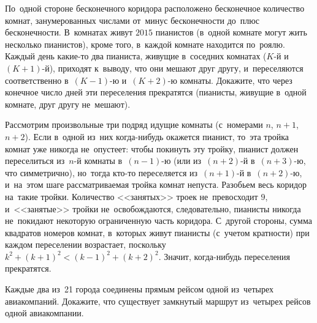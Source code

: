 \begin{problems}

\item
По~одной стороне бесконечного коридора расположено бесконечное количество
комнат, занумерованных числами от~минус бесконечности до~плюс бесконечности.
В~комнатах живут $2015$ пианистов (в~одной комнате могут жить несколько
пианистов), кроме того, в~каждой комнате находится по~роялю.
Каждый день какие-то два пианиста, живущие в~соседних комнатах
($K$-й и~$(K + 1)$-й), приходят к~выводу, что они мешают друг другу,
и~переселяются соответственно в~$(K - 1)$-ю и~$(K + 2)$-ю комнаты.
Докажите, что через конечное число дней эти переселения прекратятся
(пианисты, живущие в~одной комнате, друг другу не~мешают).

\end{problems}

\ifincludesolutions
Рассмотрим произвольные три подряд идущие комнаты
(с~номерами $n$, $n + 1$, $n + 2$).
Если в~одной из~них когда-нибудь окажется пианист, то~эта тройка комнат уже
никогда не~опустеет: чтобы покинуть эту тройку, пианист должен переселиться
из~$n$-й комнаты в~$(n - 1)$-ю (или из~$(n + 2)$-й в~$(n + 3)$-ю, что
симметрично), но~тогда кто-то переселяется из~$(n + 1)$-й в~$(n + 2)$-ю,
и~на~этом шаге рассматриваемая тройка комнат непуста.
Разобьем весь коридор на~такие тройки.
Количество <<занятых>> троек не~превосходит $9$, и~<<занятые>> тройки
не~освобождаются, следовательно, пианисты никогда не~покидают некоторую
ограниченную часть коридора.
С~другой стороны, сумма квадратов номеров комнат, в~которых живут пианисты
(с~учетом кратности) при каждом переселении возрастает, поскольку
$k^2 + (k + 1)^2 < (k - 1)^2 + (k + 2)^2$.
Значит, когда-нибудь переселения прекратятся.
\fi %

\begin{problems}

\item
Каждые два из~21 города соединены прямым рейсом одной из~четырех авиакомпаний.
Докажите, что существует замкнутый маршрут из~четырех рейсов одной
авиакомпании.

\end{problems}

